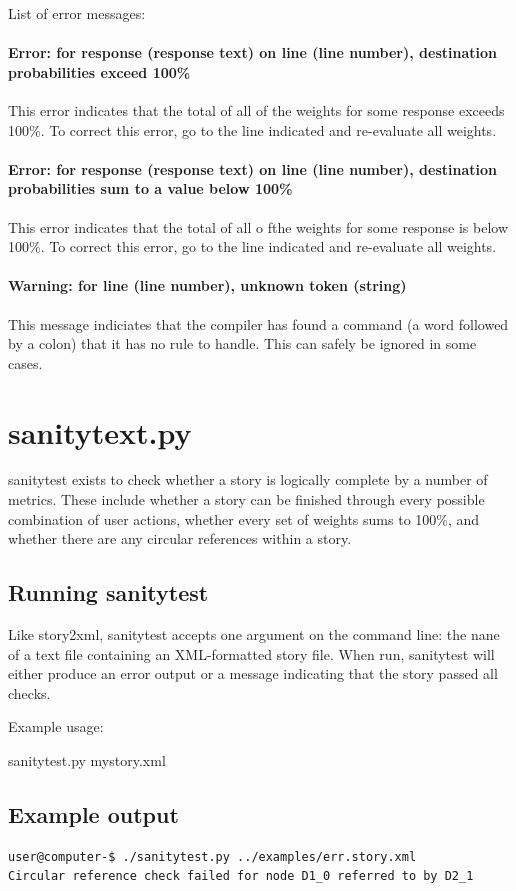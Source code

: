 \documentclass[12pt,letterpaper]{article}
\begin{document}
 List of error messages:
 \paragraph{Error: for response (response text) on line (line number), destination probabilities exceed 100\%}
 This error indicates that the total of all of the weights for some response exceeds 100\%. To correct this error, go to the line indicated and re-evaluate all weights.
 \paragraph{Error: for response (response text) on line (line number), destination probabilities sum to a value below 100\%}
 This error indicates that the total of all o fthe weights for some response is below 100\%. To correct this error, go to the line indicated and re-evaluate all weights.
 \paragraph{Warning: for line (line number), unknown token (string)}
 This message indiciates that the compiler has found a command (a word followed by a colon) that it has no rule to handle. This can safely be ignored in some cases.
 
 \section{sanitytext.py}
 sanitytest exists to check whether a story is logically complete by a number of metrics. These include whether a story can be finished through every possible
 combination of user actions, whether every set of weights sums to 100\%, and whether there are any circular references within a story. 
 
 \subsection{Running sanitytest}
 Like story2xml, sanitytest accepts one argument on the command line: the nane of a text file containing an XML-formatted story file.
 When run, sanitytest will either produce an error output or a message indicating that the story passed all checks.
 
 Example usage:
 \begin{center}
 sanitytest.py mystory.xml
 \end{center}
 
 \subsection{Example output}
 \begin{lstlisting}[breaklines=true]
user@computer-$ ./sanitytest.py ../examples/err.story.xml
Circular reference check failed for node D1_0 referred to by D2_1
 \end{lstlisting}
 
\end{document}
